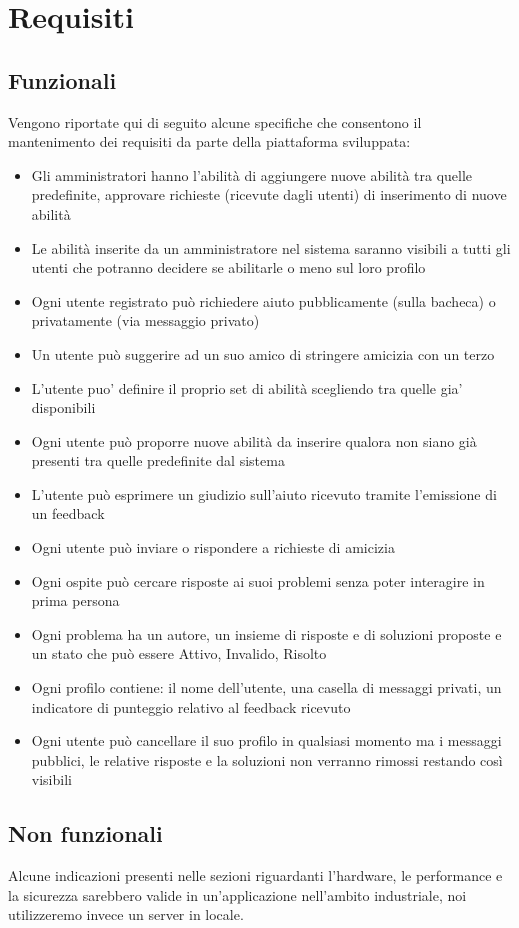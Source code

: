 \documentclass[a4paper,12pt]{article}
\begin{document}
\clearpage

\section{Requisiti}
\subsection{Funzionali}
Vengono riportate qui di seguito alcune specifiche che consentono il mantenimento dei requisiti da parte della piattaforma sviluppata:
\begin{itemize}
\item Gli amministratori hanno l’abilità di aggiungere nuove abilità tra quelle predefinite, approvare richieste (ricevute dagli utenti) di inserimento di nuove abilità
\item Le abilità inserite da un amministratore nel sistema saranno visibili a tutti gli utenti che potranno decidere se abilitarle o meno sul loro profilo
\item Ogni utente registrato può richiedere aiuto pubblicamente (sulla bacheca) o privatamente (via messaggio privato)
\item Un utente può suggerire ad un suo amico di stringere amicizia con un terzo 
\item L’utente puo' definire il proprio set di abilità scegliendo tra quelle gia' disponibili
\item Ogni utente può proporre nuove abilità da inserire qualora non siano già presenti tra quelle predefinite dal sistema
\item L’utente può esprimere un giudizio sull’aiuto ricevuto tramite l'emissione di un feedback
\item Ogni utente può inviare o rispondere a richieste di amicizia
\item Ogni ospite può cercare risposte ai suoi problemi senza poter interagire in prima persona
\item Ogni problema ha un autore, un insieme di risposte e di soluzioni proposte e un stato che può essere Attivo, Invalido, Risolto
\item Ogni profilo contiene: il nome dell’utente, una casella di messaggi privati, un indicatore di punteggio relativo al feedback ricevuto
\item Ogni utente può cancellare il suo profilo in qualsiasi momento ma i messaggi pubblici, le relative risposte e la soluzioni non verranno rimossi restando così visibili
\end{itemize}
\clearpage
\subsection{Non funzionali}
Alcune indicazioni presenti nelle sezioni riguardanti l'hardware, le performance e la sicurezza sarebbero valide in un'applicazione nell'ambito industriale, noi utilizzeremo invece un server in locale. 
\vfill{}
\end{document}
